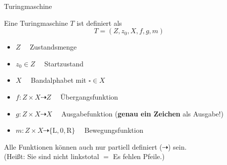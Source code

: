 

\begin{frame}{Turingmaschine}
	\begin{Definition}
		Eine Turingmaschine $T$ ist definiert als $$ T = (Z, z_0 , X, f,g, m)$$
		\begin{itemize}[<+->]
			\item $Z \quad$ Zustandsmenge 
			\item $z_0\in Z \quad$ Startzustand
			\item $X \quad$ Bandalphabet mit $\square \in X$
			\item $f:Z\times X \dashrightarrow Z \quad$ Übergangsfunktion
			\item $g:Z\times X\dashrightarrow X \quad$ Ausgabefunktion  \quad (\textbf{genau ein Zeichen} als Ausgabe!)
			\item $m:Z\times X \dashrightarrow \{\text{L},\text{0},\text{R}\} \quad$ Bewegungsfunktion
		\end{itemize}
		\pause
		Alle Funktionen können auch nur partiell definiert ($\dashrightarrow$) sein. \\
		(Heißt: Sie sind nicht linkstotal $=$ Es fehlen Pfeile.)
	\end{Definition}
\end{frame}


